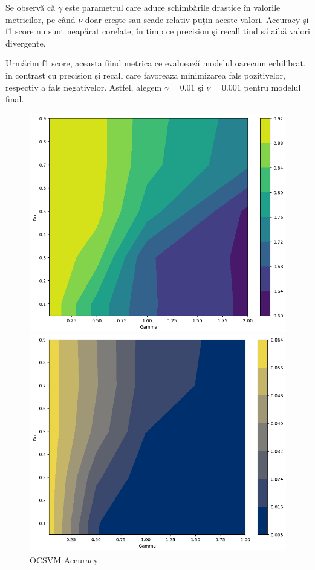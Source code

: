Se observă că $\gamma$ este parametrul care aduce schimbările drastice în valorile 
metricilor, pe când $\nu$ doar creşte sau scade relativ puţin aceste valori. Accuracy şi f1 score 
nu sunt neapărat corelate, în timp ce precision şi recall tind să aibă valori 
divergente.

Urmărim f1 score, aceasta fiind metrica ce evaluează modelul oarecum 
echilibrat, în contrast cu precision şi recall care favorează minimizarea fals pozitivelor, 
respectiv a fals negativelor. Astfel, alegem $\gamma=0.01$ şi $\nu=0.001$ pentru modelul final.

\begin{figure}[p] %
    \begin{minipage}[t]{0.5\textwidth}
        \vspace{0pt}
        \includegraphics[width=\textwidth]{images/ocsvm-accuracy.png}
        \caption{OCSVM Accuracy}
    \end{minipage}
    \hfill
    \begin{minipage}[t]{0.5\textwidth}
        \vspace{0pt}
        \includegraphics[width=\textwidth]{images/ocsvm-precision.png}

\end{minipage}
\end{figure}
